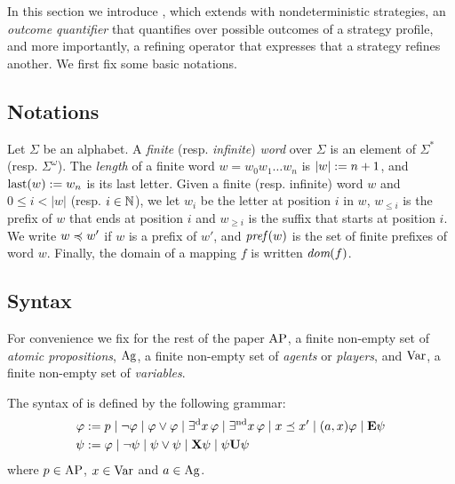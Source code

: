 
In this section we introduce \SLref, which extends \SL 
with nondeterministic strategies,  an \emph{outcome quantifier} that
quantifies over possible outcomes of a strategy profile,
and more importantly, a refining operator that expresses that a
strategy refines another.
We first fix some basic notations.


\subsection{Notations}
Let $\Sigma$ be an alphabet. A \emph{finite} (resp. \emph{infinite}) \emph{word} over $\Sigma$ is an element
of $\Sigma^{*}$ (resp. $\Sigma^{\omega}$). 
The \emph{length} of a finite word $w=w_{0}w_{1}\ldots
w_{n}$ is $|w|:= n+1$, and $\mbox{last}(w):= w_{n}$ is its last
letter.
Given a finite (resp. infinite) word $w$ and $0 \leq i < |w|$  (resp. $i\in\mathbb N$), we let $w_{i}$ be the
letter at position $i$ in $w$, $w_{\leq i}$ is the prefix of $w$ that
ends at position $i$ and $w_{\geq i}$ is the suffix that starts
at position $i$.
We write $w\preccurlyeq w'$ if $w$ is a prefix of $w'$, and $\textit{pref}\,(w)$ is
the set of finite prefixes of word $w$. 
Finally, 
the domain of a mapping $f$ is written $\textit{dom}(f)$.

 \subsection{Syntax}
 \label{sec-SL-definition}

For convenience we fix for the rest of the paper $\textnormal{AP}$, a finite non-empty set of
\emph{atomic propositions}, $\textnormal{Ag}$, a finite non-empty set of \emph{agents} or
\emph{players}, and
$\textnormal{Var}$, a finite non-empty set of \emph{variables}.



\begin{definition}%
  \label{def-SLi}
    The syntax of \SLref is defined by the following grammar:
    \begin{align*}
  \varphi:= &\; p 
  \mid \neg \varphi 
  \mid \varphi\vee\varphi 
               \mid \exists^{\text{d}} x\,\varphi  
               \mid \exists^{\text{nd}} x\,\varphi
               \mid x \preceq x'
               \mid (a,x)\varphi
  \mid {\bf E}\psi               
      \\
      \psi:= &\; \varphi
                   \mid \neg \psi
                   \mid \psi\vee \psi
                   \mid {\bf X} \psi
                   \mid  \psi {\bf U} \psi
    \end{align*}
     where %
  $p\in\textnormal{AP}$, $x\in\textnormal{Var}$ and $a\in\textnormal{Ag}$.
\end{definition}


